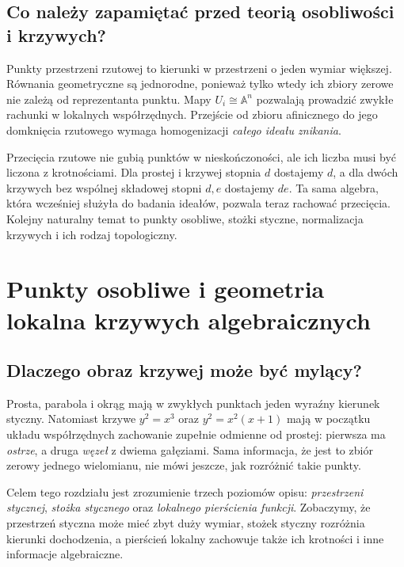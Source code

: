\documentclass[11pt,a4paper,openany]{report}
\numberwithin{equation}{section}
\theoremstyle{plain}
\theoremstyle{definition}
\theoremstyle{remark}
\newcommand{\A}{\mathbb A}
\begin{document}
\section{Co należy zapamiętać przed teorią osobliwości i krzywych?}

Punkty przestrzeni rzutowej to kierunki w przestrzeni o jeden
wymiar większej. Równania geometryczne są jednorodne,
ponieważ tylko wtedy ich zbiory zerowe nie zależą od
reprezentanta punktu. Mapy $U_i\cong\A^n$ pozwalają
prowadzić zwykłe rachunki w lokalnych współrzędnych.
Przejście od zbioru afinicznego do jego domknięcia rzutowego
wymaga homogenizacji \emph{całego ideału znikania}.

Przecięcia rzutowe nie gubią punktów w nieskończoności,
ale ich liczba musi być liczona z krotnościami.
Dla prostej i krzywej stopnia $d$ dostajemy $d$,
a dla dwóch krzywych bez wspólnej składowej stopni $d,e$
dostajemy $de$. Ta sama algebra, która wcześniej służyła
do badania ideałów, pozwala teraz rachować przecięcia.
Kolejny naturalny temat to punkty osobliwe, stożki styczne,
normalizacja krzywych i ich rodzaj topologiczny.

\chapter{Punkty osobliwe i geometria lokalna krzywych algebraicznych}
\label{ch:osobliwosci}

\section{Dlaczego obraz krzywej może być mylący?}

Prosta, parabola i okrąg mają w zwykłych punktach jeden wyraźny
kierunek styczny. Natomiast krzywe $y^2=x^3$ oraz
$y^2=x^2(x+1)$ mają w początku układu współrzędnych
zachowanie zupełnie odmienne od prostej: pierwsza ma
\emph{ostrze}, a druga \emph{węzeł} z dwiema gałęziami.
Sama informacja, że jest to zbiór zerowy jednego wielomianu,
nie mówi jeszcze, jak rozróżnić takie punkty.

Celem tego rozdziału jest zrozumienie trzech poziomów opisu:
\emph{przestrzeni stycznej}, \emph{stożka stycznego} oraz
\emph{lokalnego pierścienia funkcji}. Zobaczymy, że przestrzeń
styczna może mieć zbyt duży wymiar, stożek styczny rozróżnia
kierunki dochodzenia, a pierścień lokalny zachowuje także
ich krotności i inne informacje algebraiczne.
\end{document}
